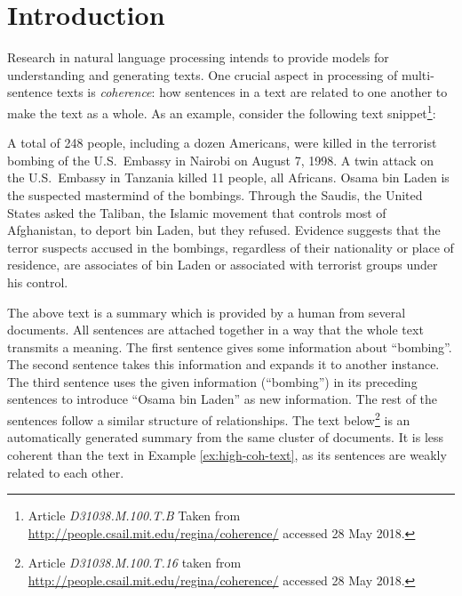 
\chapter{Introduction}
\label{ch:intro}

Research in natural language processing intends to provide models for understanding and generating texts.   
One crucial aspect in processing of multi-sentence texts is \emph{coherence}: how sentences in a text are related to one another to make the text as a whole. 
As an example, consider the following text snippet\footnote{Article \emph{D31038.M.100.T.B} Taken from \url{http://people.csail.mit.edu/regina/coherence/} accessed 28 May 2018. 
}:

\begin{examples}
\label{ex:high-coh-text}
A total of 248 people, including a dozen Americans, were killed in the terrorist bombing of the U.S.\ Embassy in Nairobi on August 7, 1998. 
A twin attack on the U.S.\ Embassy in Tanzania killed 11 people, all Africans. 
Osama bin Laden is the suspected mastermind of the bombings. 
Through the Saudis, the United States asked the Taliban, the Islamic movement that controls most of Afghanistan, to deport bin Laden, but they refused. 
Evidence suggests that the terror suspects accused in the bombings, regardless of their nationality or place of residence, are associates of bin Laden or associated with terrorist groups under his control.
\end{examples}

The above text is a summary which is provided by a human from several documents. 
All sentences are attached together in a way that the whole text transmits a meaning. 
The first sentence gives some information about ``bombing''. 
The second sentence takes this information and expands it to another instance. 
The third sentence uses the given information (``bombing'') in its preceding sentences to introduce ``Osama bin Laden'' as new information. 
The rest of the sentences follow a similar structure of relationships.  
The text below\footnote{Article \emph{D31038.M.100.T.16} taken from 
\url{http://people.csail.mit.edu/regina/coherence/}
accessed 28 May 2018.} is an automatically generated summary from the same cluster of documents. 
It is less coherent than the text in Example \ref{ex:high-coh-text}, as its sentences are weakly related to each other. 

